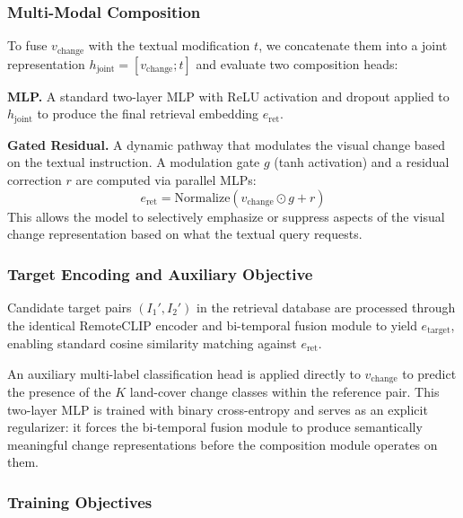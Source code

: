 \subsubsection{Multi-Modal Composition}
\label{sec:chap7_unictr_composition}
 
To fuse $v_\text{change}$ with the textual modification
$t$, we concatenate them into a joint representation
$h_\text{joint} = [v_\text{change}; t]$ and evaluate two
composition heads:
 
\textbf{MLP.} A standard two-layer MLP with ReLU
activation and dropout applied to $h_\text{joint}$ to
produce the final retrieval embedding $e_\text{ret}$.
 
\textbf{Gated Residual.} A dynamic pathway that modulates
the visual change based on the textual instruction. A
modulation gate $g$ (tanh activation) and a residual
correction $r$ are computed via parallel MLPs:
\begin{equation}
    e_\text{ret} = \text{Normalize}(v_\text{change}
    \odot g + r)
\end{equation}
This allows the model to selectively emphasize or suppress
aspects of the visual change representation based on what
the textual query requests.
 
\subsubsection{Target Encoding and Auxiliary Objective}
\label{sec:chap7_unictr_target}
 
Candidate target pairs $(I_1', I_2')$ in the retrieval
database are processed through the identical RemoteCLIP
encoder and bi-temporal fusion module to yield
$e_\text{target}$, enabling standard cosine similarity
matching against $e_\text{ret}$.
 
An auxiliary multi-label classification head is applied
directly to $v_\text{change}$ to predict the presence of
the $K$ land-cover change classes within the reference
pair. This two-layer MLP is trained with binary
cross-entropy and serves as an explicit regularizer: it
forces the bi-temporal fusion module to produce
semantically meaningful change representations before the
composition module operates on them.
 
\subsubsection{Training Objectives}
\label{sec:chap7_unictr_training}
 
